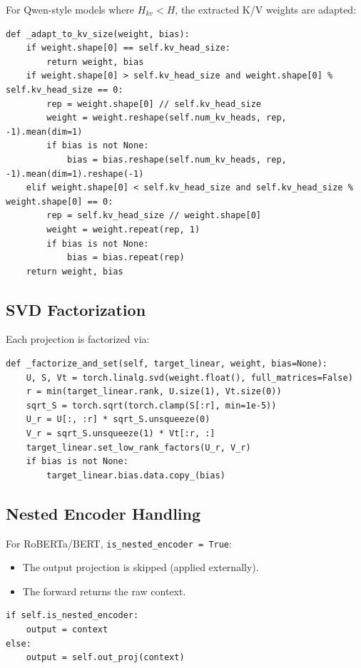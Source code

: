 For Qwen-style models where $H_{kv} < H$, the extracted K/V weights are 
adapted:

\begin{lstlisting}
def _adapt_to_kv_size(weight, bias):
    if weight.shape[0] == self.kv_head_size:
        return weight, bias
    if weight.shape[0] > self.kv_head_size and weight.shape[0] % self.kv_head_size == 0:
        rep = weight.shape[0] // self.kv_head_size
        weight = weight.reshape(self.num_kv_heads, rep, -1).mean(dim=1)
        if bias is not None:
            bias = bias.reshape(self.num_kv_heads, rep, -1).mean(dim=1).reshape(-1)
    elif weight.shape[0] < self.kv_head_size and self.kv_head_size % weight.shape[0] == 0:
        rep = self.kv_head_size // weight.shape[0]
        weight = weight.repeat(rep, 1)
        if bias is not None:
            bias = bias.repeat(rep)
    return weight, bias
\end{lstlisting}

\subsection{SVD Factorization}

Each projection is factorized via:

\begin{lstlisting}
def _factorize_and_set(self, target_linear, weight, bias=None):
    U, S, Vt = torch.linalg.svd(weight.float(), full_matrices=False)
    r = min(target_linear.rank, U.size(1), Vt.size(0))
    sqrt_S = torch.sqrt(torch.clamp(S[:r], min=1e-5))
    U_r = U[:, :r] * sqrt_S.unsqueeze(0)
    V_r = sqrt_S.unsqueeze(1) * Vt[:r, :]
    target_linear.set_low_rank_factors(U_r, V_r)
    if bias is not None:
        target_linear.bias.data.copy_(bias)
\end{lstlisting}

\subsection{Nested Encoder Handling}

For RoBERTa/BERT, \texttt{is\_nested\_encoder = True}:
\begin{itemize}
\item The output projection is skipped (applied externally).
\item The forward returns the raw context.

\end{itemize}
\begin{lstlisting}
if self.is_nested_encoder:
    output = context
else:
    output = self.out_proj(context)
\end{lstlisting}

